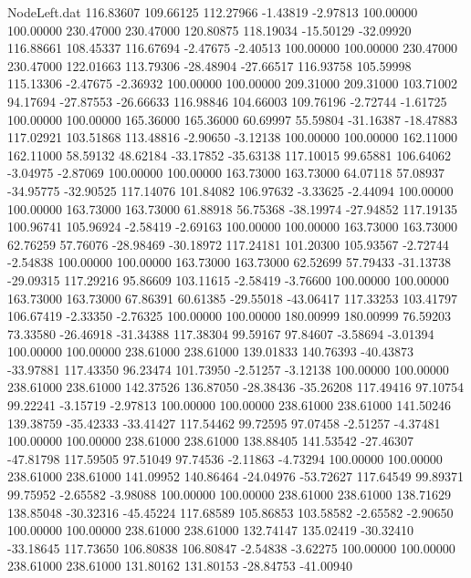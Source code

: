 \begin{filecontents}{NodeLeft.dat}
 116.83607  109.66125  112.27966    -1.43819   -2.97813  100.00000  100.00000  230.47000  230.47000  120.80875  118.19034  -15.50129  -32.09920
 116.88661  108.45337  116.67694    -2.47675   -2.40513  100.00000  100.00000  230.47000  230.47000  122.01663  113.79306  -28.48904  -27.66517
 116.93758  105.59998  115.13306    -2.47675   -2.36932  100.00000  100.00000  209.31000  209.31000  103.71002   94.17694  -27.87553  -26.66633
 116.98846  104.66003  109.76196    -2.72744   -1.61725  100.00000  100.00000  165.36000  165.36000   60.69997   55.59804  -31.16387  -18.47883
 117.02921  103.51868  113.48816    -2.90650   -3.12138  100.00000  100.00000  162.11000  162.11000   58.59132   48.62184  -33.17852  -35.63138
 117.10015   99.65881  106.64062    -3.04975   -2.87069  100.00000  100.00000  163.73000  163.73000   64.07118   57.08937  -34.95775  -32.90525
 117.14076  101.84082  106.97632    -3.33625   -2.44094  100.00000  100.00000  163.73000  163.73000   61.88918   56.75368  -38.19974  -27.94852
 117.19135  100.96741  105.96924    -2.58419   -2.69163  100.00000  100.00000  163.73000  163.73000   62.76259   57.76076  -28.98469  -30.18972
 117.24181  101.20300  105.93567    -2.72744   -2.54838  100.00000  100.00000  163.73000  163.73000   62.52699   57.79433  -31.13738  -29.09315
 117.29216   95.86609  103.11615    -2.58419   -3.76600  100.00000  100.00000  163.73000  163.73000   67.86391   60.61385  -29.55018  -43.06417
 117.33253  103.41797  106.67419    -2.33350   -2.76325  100.00000  100.00000  180.00999  180.00999   76.59203   73.33580  -26.46918  -31.34388
 117.38304   99.59167   97.84607    -3.58694   -3.01394  100.00000  100.00000  238.61000  238.61000  139.01833  140.76393  -40.43873  -33.97881
 117.43350   96.23474  101.73950    -2.51257   -3.12138  100.00000  100.00000  238.61000  238.61000  142.37526  136.87050  -28.38436  -35.26208
 117.49416   97.10754   99.22241    -3.15719   -2.97813  100.00000  100.00000  238.61000  238.61000  141.50246  139.38759  -35.42333  -33.41427
 117.54462   99.72595   97.07458    -2.51257   -4.37481  100.00000  100.00000  238.61000  238.61000  138.88405  141.53542  -27.46307  -47.81798
 117.59505   97.51049   97.74536    -2.11863   -4.73294  100.00000  100.00000  238.61000  238.61000  141.09952  140.86464  -24.04976  -53.72627
 117.64549   99.89371   99.75952    -2.65582   -3.98088  100.00000  100.00000  238.61000  238.61000  138.71629  138.85048  -30.32316  -45.45224
 117.68589  105.86853  103.58582    -2.65582   -2.90650  100.00000  100.00000  238.61000  238.61000  132.74147  135.02419  -30.32410  -33.18645
 117.73650  106.80838  106.80847    -2.54838   -3.62275  100.00000  100.00000  238.61000  238.61000  131.80162  131.80153  -28.84753  -41.00940

\end{filecontents}
